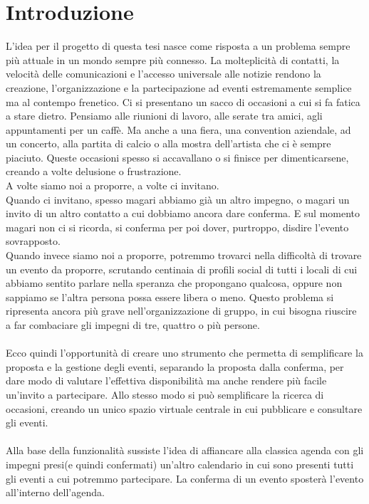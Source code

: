 \section{Introduzione}

L'idea per il progetto di questa tesi nasce come risposta a un problema sempre più attuale in un mondo sempre più connesso.
La molteplicità di contatti, la velocità delle comunicazioni e l'accesso universale alle notizie 
rendono la creazione, l'organizzazione e la partecipazione ad eventi estremamente semplice ma al contempo frenetico.
Ci si presentano un sacco di occasioni a cui si fa fatica a stare dietro.
Pensiamo alle riunioni di lavoro, alle serate tra amici, agli appuntamenti per un caffè.
Ma anche a una fiera, una convention aziendale, ad un concerto, alla partita di calcio o alla mostra dell'artista che ci è sempre piaciuto.
Queste occasioni spesso si accavallano o si finisce per dimenticarsene, creando a volte delusione o frustrazione.\\
\hfill \break
A volte siamo noi a proporre, a volte ci invitano. \\
Quando ci invitano, spesso magari abbiamo già un altro impegno, o magari un invito di un altro contatto a cui dobbiamo ancora dare conferma. 
E sul momento magari non ci si ricorda, si conferma per poi dover, purtroppo, disdire l'evento sovrapposto.\\
Quando invece siamo noi a proporre, potremmo trovarci nella difficoltà di trovare un evento da proporre, 
scrutando centinaia di profili social di tutti i locali di cui abbiamo sentito parlare nella speranza che propongano qualcosa, 
oppure non sappiamo se l'altra persona possa essere libera o meno. 
Questo problema si ripresenta ancora più grave nell'organizzazione di gruppo, in cui bisogna riuscire a far combaciare gli impegni di tre, quattro o più persone.\\
\\
Ecco quindi l'opportunità di creare uno strumento che permetta di semplificare la proposta e la gestione degli eventi, 
separando la proposta dalla conferma, per dare modo di valutare l'effettiva disponibilità ma anche rendere più facile un'invito a partecipare.
Allo stesso modo si può semplificare la ricerca di occasioni, creando un unico spazio virtuale centrale in cui pubblicare e consultare gli eventi.\\
\\
Alla base della funzionalità sussiste l'idea di affiancare alla classica agenda con gli impegni presi(e quindi confermati) 
un'altro calendario in cui sono presenti tutti gli eventi a cui potremmo partecipare. La conferma di un evento sposterà l'evento all'interno dell'agenda.\\
